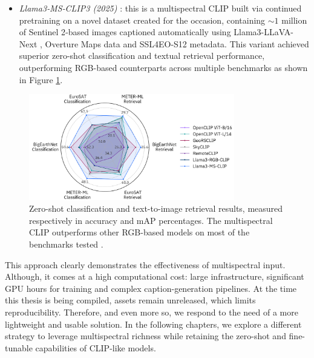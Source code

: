 \documentclass[a4paper, oneside, english]{sapthesis} %
\begin{document}
\begin{itemize}
    \item \emph{Llama3‑MS‑CLIP3 (2025)} \cite{marimo2025beyond}: this is a multispectral CLIP built via continued pretraining on a novel dataset created for the occasion, containing $\sim 1$ million of Sentinel 2‑based images captioned automatically using Llama3-LLaVA-Next \cite{li2024llava}, Overture Maps data and SSL4EO-S12 \cite{wang2023ssl4eo} metadata. This variant achieved superior zero-shot classification and textual retrieval performance, outperforming RGB-based counterparts across multiple benchmarks as shown in Figure \ref{fig:msclip}.
\end{itemize}

\begin{figure}[h]
    \centering
    \includegraphics[width=0.8\textwidth]{img/MS-CLIP.png}
    \caption{Zero-shot classification and text-to-image retrieval results, measured respectively in accuracy and mAP percentages. The multispectral CLIP outperforms other RGB-based models on most of the benchmarks tested \cite{marimo2025beyond}.}
    \label{fig:msclip}
\end{figure}

This approach clearly demonstrates the effectiveness of multispectral input. Although, it comes at a high computational cost: large infrastructure, significant GPU hours for training and complex caption-generation pipelines. At the time this thesis is being compiled, assets remain unreleased, which limits reproducibility. Therefore, and even more so, we respond to the need of a more lightweight and usable solution. In the following chapters, we explore a different strategy to leverage multispectral richness while retaining the zero-shot and fine-tunable capabilities of CLIP-like models.


\end{document}

